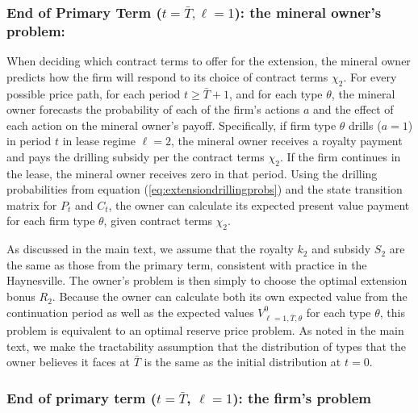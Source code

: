 \documentclass[12pt]{article}
\begin{document}
\subsubsection{End of Primary Term ($t = \bar{T}, \ell=1$): the mineral owner's problem:} \label{subsub:owner_endpriterm}

When deciding which contract terms to offer for the extension, the mineral owner predicts how the firm will respond to its choice of contract terms $\chi_2$. For every possible price path, for each period $t \geq \bar{T} + 1$, and for each type $\theta$, the mineral owner forecasts the probability of each of the firm's actions $a$ and the effect of each action on the mineral owner's payoff. Specifically, if firm type $\theta$ drills ($a = 1$) in period $t$ in lease regime $\ell=2$, the mineral owner receives a royalty payment and pays the drilling subsidy per the contract terms $\chi_2$. If the firm continues in the lease, the mineral owner receives zero in that period. Using the drilling probabilities from equation (\ref{eq:extensiondrillingprobs}) and the state transition matrix for $P_t$ and $C_t$, the owner can calculate its expected present value payment for each firm type $\theta$, given contract terms $\chi_2$.

As discussed in the main text, we assume that the royalty $k_2$ and subsidy $S_2$ are the same as those from the primary term, consistent with practice in the Haynesville. The owner's problem is then simply to choose the optimal extension bonus $R_2$. Because the owner can calculate both its own expected value from the continuation period as well as the expected values $V^0_{\ell=1,\bar{T},\theta}$ for each type $\theta$, this problem is equivalent to an optimal reserve price problem. As noted in the main text, we make the tractability assumption that the distribution of types that the owner believes it faces at $\bar{T}$ is the same as the initial distribution at $t=0$.



\subsubsection{End of primary term ($t = \bar{T}$, $\ell=1$): the firm's problem} \label{subsub:firm_endpriterm}
\end{document}
